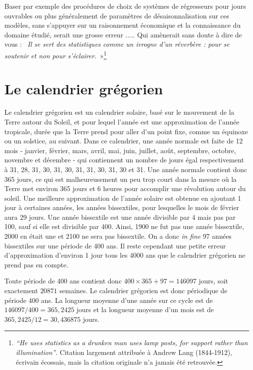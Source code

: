 \documentclass[12pt, a4paper, french]{article}
\begin{document}
Baser par exemple des procédures de choix de systèmes de régresseurs pour jours ouvrables ou plus généralement de paramètres de désaisonnalisation sur ces modèles, sans s'appuyer sur un raisonnement économique et la connaissance du domaine étudié, serait une grosse erreur ..... Qui amènerait sans doute à dire de vous : \og~\textit{Il se sert des statistiques comme un ivrogne d'un réverbère : pour se soutenir et non pour s'éclairer.}~»\footnote{\textit{``He uses statistics as a drunken man uses lamp posts, for support rather than illumination''}. Citation largement attribuée à Andrew Lang (1844-1912), écrivain écossais, mais la citation originale n'a jamais été retrouvée.}

\appendix
\section{Le calendrier grégorien}
\label{sec:cal}

Le calendrier grégorien est un calendrier solaire, basé sur le mouvement de la Terre autour du Soleil, et pour lequel l'année est une approximation de l'année tropicale, durée que la Terre prend pour aller d'un point fixe, comme un équinoxe ou un solstice, au suivant. Dans ce calendrier, une année normale est faite de 12 mois - janvier, février, mars, avril, mai, juin, juillet, août, septembre, octobre, novembre et décembre - qui contiennent un nombre de jours égal respectivement à 31, 28, 31, 30, 31, 30, 31, 31, 30, 31, 30 et 31. Une année normale contient donc 365 jours, ce qui est malheureusement un peu trop court dans la mesure où la Terre met environ 365 jours et 6 heures pour accomplir une révolution autour du soleil. Une meilleure approximation de l'année solaire est obtenue en ajoutant 1 jour à certaines années, les années bissextiles, pour lesquelles le mois de février aura 29 jours. Une année bissextile est une année divisible par 4 mais pas par 100, sauf si elle est divisible par 400. Ainsi, 1900 ne fut pas une année bissextile, 2000 en était une et 2100 ne sera pas bissextile. On a donc \emph{in fine} 97 années bissextiles sur une période de 400 ans. Il reste cependant une petite erreur d'approximation d'environ 1 jour tous les 4000 ans que le calendrier grégorien ne prend pas en compte.

Toute période de 400 ans contient donc $400 \times 365 + 97 = 146097$ jours, soit exactement $20871$ semaines. Le calendrier grégorien est donc périodique de période 400 ans. La longueur moyenne d'une année sur ce cycle est de $146097 / 400 = 365,2425$ jours et la longueur moyenne d'un mois est de $365,2425 / 12 = 30,436875$ jours.
\end{document}
